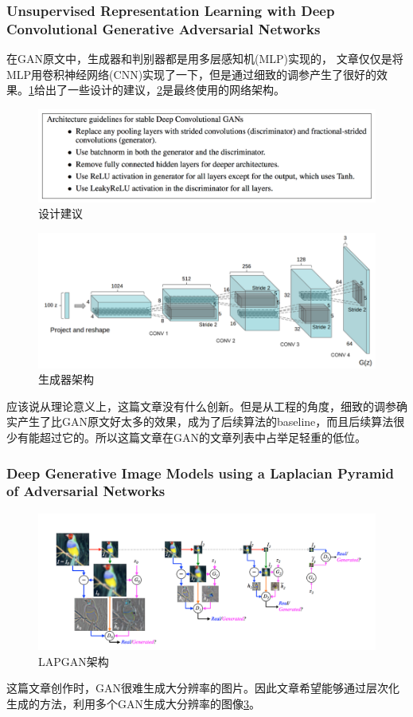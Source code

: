\documentclass[a4paper]{article}
\begin{document}
\subsubsection{Unsupervised Representation Learning with Deep Convolutional Generative Adversarial Networks\cite{DBLP:journals/corr/RadfordMC15}}
在GAN原文中，生成器和判别器都是用多层感知机(MLP)实现的，
文章仅仅是将MLP用卷积神经网络(CNN)实现了一下，但是通过细致的调参产生了很好的效果。\ref{fig:9}给出了一些设计的建议，\ref{fig:10}是最终使用的网络架构。
\begin{figure}
\centering
\includegraphics[width=\textwidth]{./img/9.png}
\caption{设计建议}
\label{fig:9}
\end{figure}
\begin{figure}
\centering
\includegraphics[width=\textwidth]{./img/10.png}
\caption{生成器架构}
\label{fig:10}
\end{figure}

应该说从理论意义上，这篇文章没有什么创新。但是从工程的角度，细致的调参确实产生了比GAN原文好太多的效果，成为了后续算法的baseline，而且后续算法很少有能超过它的。所以这篇文章在GAN的文章列表中占举足轻重的低位。
\subsubsection{Deep Generative Image Models using a Laplacian Pyramid of Adversarial Networks\cite{DBLP:journals/corr/DentonCSF15}}
\begin{figure}
\centering
\includegraphics[width=\textwidth]{./img/15.png}
\caption{LAPGAN架构}
\label{fig:15}
\end{figure}
这篇文章创作时，GAN很难生成大分辨率的图片。因此文章希望能够通过层次化生成的方法，利用多个GAN生成大分辨率的图像\ref{fig:15}。
\end{document}

